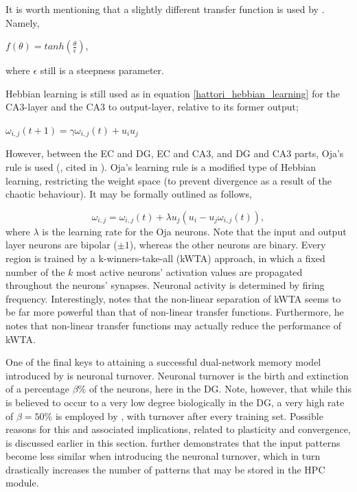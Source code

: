 It is worth mentioning that a slightly different transfer function is used by \cite{Hattori2014}. Namely,

\begin{center}
    $f(\theta) = tanh(\frac{\theta}{\epsilon})$,
\end{center}
where $\epsilon$ still is a steepness parameter.

Hebbian learning is still used as in equation \ref{hattori_hebbian_learning} for the CA3-layer and the CA3 to output-layer, relative to its former output;

\begin{center}
\begin{math}
    \omega_{i,j}(t+1) = \gamma \omega_{i,j}(t) + u_i u_j
\end{math}
\end{center}

However, between the EC and DG, EC and CA3, and DG and CA3 parts, Oja's rule is used (\cite{Hertz1991}, cited in \cite{Hattori2014}). Oja's learning rule is a modified type of Hebbian learning, restricting the weight space (to prevent divergence as a result of the chaotic behaviour). It may be formally outlined as follows,

\begin{equation}\label{ojas_rule}
    \omega_{i,j} = \omega_{i,j}(t) + \lambda u_j (u_i - u_j \omega_{i,j}(t)),
\end{equation}
where $\lambda$ is the learning rate for the Oja neurons. Note that the input and output layer neurons are bipolar ($\pm 1$), whereas the other neurons are binary. Every region is trained by a k-winners-take-all (kWTA) approach, in which a fixed number of the $k$ most active neurons' activation values are propagated throughout the neurons' synapses. Neuronal activity is determined by firing frequency. Interestingly, \citep{Hattori2014} notes that the non-linear separation of kWTA seems to be far more powerful than that of non-linear transfer functions. Furthermore, he notes that non-linear transfer functions may actually reduce the performance of kWTA.

One of the final keys to attaining a successful dual-network memory model introduced by \cite{Hattori2014} is neuronal turnover. Neuronal turnover is the birth and extinction of a percentage $\beta \%$ of the neurons, here in the DG. Note, however, that while this is believed to occur to a very low degree biologically in the DG, a very high rate of $\beta = 50 \%$ is employed by \cite{Hattori2014}, with turnover after every training set. Possible reasons for this and associated implications, related to plasticity and convergence, is discussed earlier in this section. \cite{Hattori2014} further demonstrates that the input patterns become less similar when introducing the neuronal turnover, which in turn drastically increases the number of patterns that may be stored in the HPC module.


